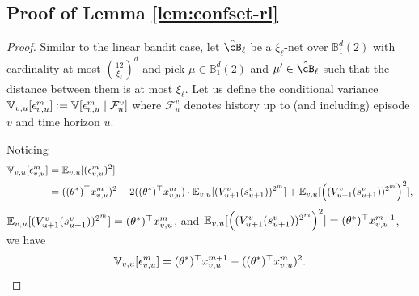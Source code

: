 \subsection{Proof of Lemma \ref{lem:confset-rl} }

\begin{proof} 
\def\VV{\mathbb{V}}
\def\EE{\mathbb{E}}
\def\cF{\mathcal{F}}
Similar to the linear bandit case, let $\hcB_\ell$ be a $\xi_\ell$-net over $\mathbb{B}_1^d(2)$ with cardinality at most $(\frac{12}{\xi_\ell})^d$ and pick $\mu \in \mathbb{B}_1^d(2)$ and $\mu'\in \hcB_\ell$ such that the distance between them is at most $\xi_\ell$. Let us define the conditional variance $\VV_{v,u}[\eps^m_{v,u}] := \VV[\eps^m_{v,u} \mid \cF_{u}^v]$ where $\cF_{u}^v$ denotes history up to (and including) episode $v$ and time horizon $u$.

Noticing
\begin{align*}
  \VV_{v,u}[\eps^m_{v,u}] 
  &= \EE_{v,u}[(\eps^m_{v,u})^2]
\\&= ((\th^* )^\T x^{m}_{v,u})^2 - 2 ((\th^* )^\T x^{m}_{v,u}) \cd \EE_{v,u}[ (V^v_{u+1}(s^v_{u+1}))^{2^m} ] + \EE_{v,u}[ \del{(V_{u+1}^v(s^v_{u+1}))^{2^m} }^2],
\end{align*}
$\EE_{v,u}[ (V^v_{u+1}(s^v_{u+1}))^{2^m} ] = (\th^* )^\T x^{m}_{v,u}$, and $\EE_{v,u}[ \del{(V_{u+1}^v(s^v_{u+1}))^{2^m} }^2] = (\th^*)^\T x^{m+1}_{v,u}$, we have
$$\VV_{v,u}[\eps^m_{v,u}]  = (\th^*)^\T x^{m+1}_{v,u} - ((\th^*)^\T x^{m}_{v,u})^2.$$



\end{proof}
